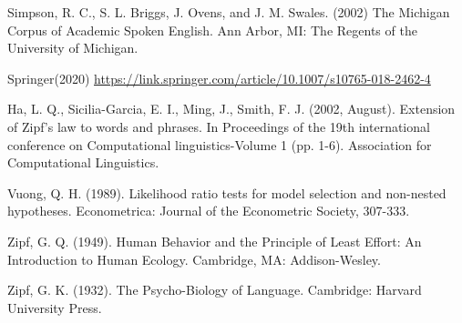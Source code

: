 \documentclass[12pt]{article}
\begin{document}
\begin{thebibliography}{9}
Simpson, R. C., S. L. Briggs, J. Ovens, and J. M. Swales. (2002) The Michigan Corpus of Academic Spoken English. Ann Arbor, MI: The Regents of the University of Michigan.

Springer(2020) \url{https://link.springer.com/article/10.1007/s10765-018-2462-4}

Ha, L. Q., Sicilia-Garcia, E. I., Ming, J., Smith, F. J. (2002, August). Extension of Zipf's law to words and phrases. In Proceedings of the 19th international conference on Computational linguistics-Volume 1 (pp. 1-6). Association for Computational Linguistics.

Vuong, Q. H. (1989). Likelihood ratio tests for model selection and non-nested hypotheses. Econometrica: Journal of the Econometric Society, 307-333.

Zipf, G. Q. (1949). Human Behavior and the Principle of Least Effort: An Introduction to Human Ecology. Cambridge, MA: Addison-Wesley.

Zipf, G. K. (1932). The Psycho-Biology of Language. Cambridge: Harvard University Press. 




\end{thebibliography}
\end{document}

